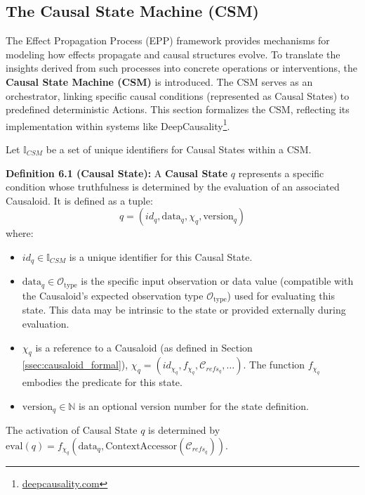 \subsection[The Causal State Machine (CSM) ]{The Causal State Machine (CSM)}
\label{sec:formalization_csm}

The Effect Propagation Process (EPP) framework provides mechanisms for modeling how effects propagate and causal structures evolve. To translate the insights derived from such processes into concrete operations or interventions, the \textbf{Causal State Machine (CSM)} is introduced. The CSM serves as an orchestrator, linking specific causal conditions (represented as Causal States) to predefined deterministic Actions. This section formalizes the CSM, reflecting its implementation within systems like DeepCausality\footnote{\url{deepcausality.com}}.

Let \(\mathbb{I}_{CSM}\) be a set of unique identifiers for Causal States within a CSM.

\noindent\textbf{Definition 6.1 (Causal State):} A \textbf{Causal State} \(q\) represents a specific condition whose truthfulness is determined by the evaluation of an associated Causaloid. It is defined as a tuple:
\[ q = (id_q, \text{data}_q, \chi_q, \text{version}_q) \]
where:
\begin{itemize}
    \item \( id_q \in \mathbb{I}_{CSM} \) is a unique identifier for this Causal State.
    \item \( \text{data}_q \in \mathcal{O}_{\text{type}} \) is the specific input observation or data value (compatible with the Causaloid's expected observation type \(\mathcal{O}_{\text{type}}\)) used for evaluating this state. This data may be intrinsic to the state or provided externally during evaluation.
    \item \( \chi_q \) is a reference to a Causaloid (as defined in Section \ref{ssec:causaloid_formal}), \( \chi_q = (id_{\chi_q}, f_{\chi_q}, \mathcal{C}_{refs_q}, \dots) \). The function \(f_{\chi_q}\) embodies the predicate for this state.
    \item \( \text{version}_q \in \mathbb{N} \) is an optional version number for the state definition.
\end{itemize}
The activation of Causal State \(q\) is determined by \( \text{eval}(q) = f_{\chi_q}(\text{data}_q, \text{ContextAccessor}(\mathcal{C}_{refs_q})) \).


